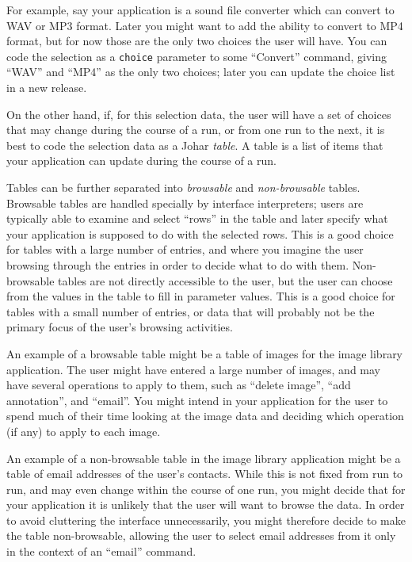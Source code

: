 \documentclass[11pt]{report}
\begin{document}
For example, say your application is a
sound file converter which can convert to WAV or MP3 format.
Later you might want to add the ability to convert to MP4
format, but for now those are the only two choices the user will
have.  You can code the selection as a {\tt choice} parameter to
some ``Convert'' command, giving ``WAV'' and ``MP4'' as the only
two choices; later you can update the choice list in a new
release.

On the other hand, if, for this selection data, the user will
have a set of choices that may change during the course of a
run, or from one run to the next, it is best to code the
selection data as a Johar {\it table}.  A table is a list of
items that your application can update during the course of a
run.

Tables can be further separated into {\it browsable} and
{\it non-browsable} tables.  Browsable tables are handled
specially by interface interpreters; users are typically able to
examine and select ``rows'' in the table and later specify what
your application is supposed to do with the selected rows.
This is a good choice for tables with a large number of entries,
and where you imagine the user browsing through the entries
in order to decide what to do with them.
Non-browsable tables are not directly accessible to the user,
but the user can choose from the values in the table to fill in
parameter values.  This is a good choice for tables with a small
number of entries, or data that will probably not be the primary
focus of the user's browsing activities.

An example of a browsable table might be a table of images for
the image library application.  The user might have entered a
large number of images, and may have several operations to apply
to them, such as ``delete image'', ``add annotation'', and
``email''.  You might intend in your application for the user to
spend much of their time looking at the image data and deciding
which operation (if any) to apply to each image.

An example of a non-browsable table in the image library
application might be a table of email
addresses of the user's contacts.  While this is not fixed from
run to run, and may even change within the course of one run,
you might decide that for your application it is unlikely that
the user will want to browse the data.  In order to avoid
cluttering the interface unnecessarily, you might therefore
decide to make the table non-browsable, allowing the user to
select email addresses from it only in the context of an
``email'' command.
\end{document}
